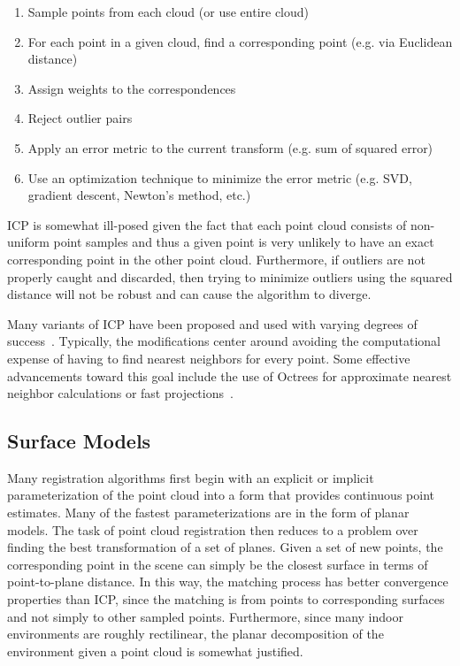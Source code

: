 \documentclass{article} %
\begin{document}
\begin{enumerate}
 \item Sample points from each cloud (or use entire cloud)
 \item For each point in a given cloud, find a corresponding point (e.g. via Euclidean distance)
 \item Assign weights to the correspondences
 \item Reject outlier pairs
 \item Apply an error metric to the current transform (e.g. sum of squared error)
 \item Use an optimization technique to minimize the error metric (e.g. SVD, gradient descent, Newton's method, etc.)
\end{enumerate}

ICP is somewhat ill-posed given the fact that each point cloud consists of non-uniform point samples and thus a given point is very unlikely to have an exact corresponding point in the other point cloud. Furthermore, if outliers are not properly caught and discarded, then trying to minimize outliers using the squared distance will not be robust and can cause the algorithm to diverge. 

Many variants of ICP have been proposed and used with varying degrees of success~\cite{mitra_registration_2004}. Typically, the modifications center around avoiding the computational expense of having to find nearest neighbors for every point. Some effective advancements toward this goal include the use of Octrees for approximate nearest neighbor calculations or fast projections~\cite{rusinkiewicz2001efficient}. 

\subsection{Surface Models}

Many registration algorithms first begin with an explicit or implicit parameterization of the point cloud into a form that provides continuous point estimates. Many of the fastest parameterizations are in the form of planar models. The task of point cloud registration then reduces to a problem over finding the best transformation of a set of planes\cite{martin_real-time_2002}\cite{liu_using_2001}\cite{thrun_real-time_2004}. Given a set of new points, the corresponding point in the scene can simply be the closest surface in terms of point-to-plane distance. In this way, the matching process has better convergence properties than ICP, since the matching is from points to corresponding surfaces and not simply to other sampled points. Furthermore, since many indoor environments are roughly rectilinear, the planar decomposition of the environment given a point cloud is somewhat justified. 
\end{document}
